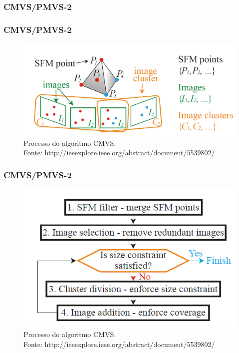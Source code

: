 \documentclass[table, usenames, svgnames, xcolor=dvipsnames]{beamer}
\begin{document}
\subsubsection{CMVS/PMVS-2}

\begin{frame} 
\frametitle{\textbf{CMVS/PMVS-2}}
	\begin{center}
		\begin{figure}
			\includegraphics[width=0.8\linewidth]{figs/cmvs.png}
			\caption{Processo do algoritmo CMVS. \\
			\tiny{Fonte: http://ieeexplore.ieee.org/abstract/document/5539802/}
			}
		\end{figure}
	\end{center}
\end{frame}

\begin{frame} 
\frametitle{\textbf{CMVS/PMVS-2}}
	\begin{center}
		\begin{figure}
			\includegraphics[width=0.7\linewidth]{figs/cmvspipe.png}
			\caption{Processo do algoritmo CMVS. \\
			\tiny{Fonte: http://ieeexplore.ieee.org/abstract/document/5539802/}
			}
		\end{figure}
	\end{center}
\end{frame}
\end{document}
